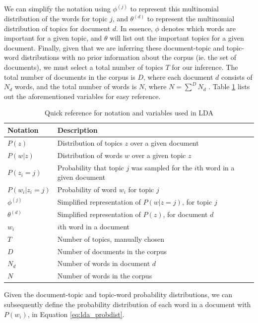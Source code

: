 \documentclass[a4paper]{article}
\begin{document}
We can simplify the notation using $\phi^{(j)}$ to represent this multinomial distribution of the words for topic $j$, and $\theta^{(d)}$ to represent the multinomial distribution of topics for document $d$. In essence, $\phi$ denotes which words are important for a given topic, and $\theta$ will list out the important topics for a given document. Finally, given that we are inferring these document-topic and topic-word distributions with no prior information about the corpus (ie. the set of documents), we must select a total number of topics $T$ for our inference. The total number of documents in the corpus is $D$, where each document $d$ consists of $N_d$ words, and the total number of words is $N$, where $N = \sum\limits^D{N_d}$ \cite{lda}. Table \ref{tab:ldavars} lists out the aforementioned variables for easy reference.
\begin{table}[h]
  \centering %
  \begin{tabular}{ |l|l| }
    \hline
    Notation & Description \\
    \hline
    \hline
    $P(z)$ & Distribution of topics $z$ over a given document \\
    $P(w | z)$ & Distribution of words $w$ over a given topic $z$ \\
    $P(z_i = j)$ & Probability that topic $j$ was sampled for the $i$th word in a given document \\
    $P(w_i | z_i = j)$ & Probability of word $w_i$ for topic $j$ \\
    $\phi^{(j)}$ & Simplified representation of $P(w | z = j)$, for topic $j$ \\
    $\theta^{(d)}$ & Simplified representation of $P(z)$, for document $d$ \\
    $w_i$ & $i$th word in a document \\
    $T$ & Number of topics, manually chosen \\
    $D$ & Number of documents in the corpus \\
    $N_d$ & Number of words in document $d$ \\
    $N$ & Number of words in the corpus \\
    \hline
  \end{tabular}
  \caption{Quick reference for notation and variables used in LDA}
  \label{tab:ldavars}
\end{table}

Given the document-topic and topic-word probability distributions, we can subsequently define the probability distribution of each word in a document with $P(w_i)$, in Equation \ref{eq:lda_probdist}.
\end{document}
